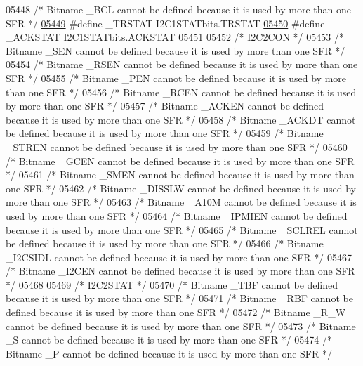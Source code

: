 \begin{DoxyCode}
05448 \textcolor{comment}{/* Bitname \_BCL cannot be defined because it is used by more than one SFR */}
\hypertarget{a00015_source_l05449}{}\hyperlink{a00015_aa3ff3c708a1cc5019e81a2ffe6e62fb6}{05449} \textcolor{preprocessor}{#define \_TRSTAT I2C1STATbits.TRSTAT}
\hypertarget{a00015_source_l05450}{}\hyperlink{a00015_a1b2ab09c4abbe6df3113a5f4fb6ee46e}{05450} \textcolor{preprocessor}{#define \_ACKSTAT I2C1STATbits.ACKSTAT}
05451 
05452 \textcolor{comment}{/* I2C2CON */}
05453 \textcolor{comment}{/* Bitname \_SEN cannot be defined because it is used by more than one SFR */}
05454 \textcolor{comment}{/* Bitname \_RSEN cannot be defined because it is used by more than one SFR */}
05455 \textcolor{comment}{/* Bitname \_PEN cannot be defined because it is used by more than one SFR */}
05456 \textcolor{comment}{/* Bitname \_RCEN cannot be defined because it is used by more than one SFR */}
05457 \textcolor{comment}{/* Bitname \_ACKEN cannot be defined because it is used by more than one SFR */}
05458 \textcolor{comment}{/* Bitname \_ACKDT cannot be defined because it is used by more than one SFR */}
05459 \textcolor{comment}{/* Bitname \_STREN cannot be defined because it is used by more than one SFR */}
05460 \textcolor{comment}{/* Bitname \_GCEN cannot be defined because it is used by more than one SFR */}
05461 \textcolor{comment}{/* Bitname \_SMEN cannot be defined because it is used by more than one SFR */}
05462 \textcolor{comment}{/* Bitname \_DISSLW cannot be defined because it is used by more than one SFR */}
05463 \textcolor{comment}{/* Bitname \_A10M cannot be defined because it is used by more than one SFR */}
05464 \textcolor{comment}{/* Bitname \_IPMIEN cannot be defined because it is used by more than one SFR */}
05465 \textcolor{comment}{/* Bitname \_SCLREL cannot be defined because it is used by more than one SFR */}
05466 \textcolor{comment}{/* Bitname \_I2CSIDL cannot be defined because it is used by more than one SFR */}
05467 \textcolor{comment}{/* Bitname \_I2CEN cannot be defined because it is used by more than one SFR */}
05468 
05469 \textcolor{comment}{/* I2C2STAT */}
05470 \textcolor{comment}{/* Bitname \_TBF cannot be defined because it is used by more than one SFR */}
05471 \textcolor{comment}{/* Bitname \_RBF cannot be defined because it is used by more than one SFR */}
05472 \textcolor{comment}{/* Bitname \_R\_W cannot be defined because it is used by more than one SFR */}
05473 \textcolor{comment}{/* Bitname \_S cannot be defined because it is used by more than one SFR */}
05474 \textcolor{comment}{/* Bitname \_P cannot be defined because it is used by more than one SFR */}

\end{DoxyCode}
